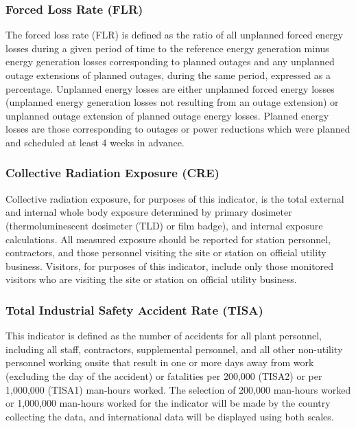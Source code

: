 \documentclass{article}
\begin{document}
\subsubsection*{Forced Loss Rate (FLR)}\label{FLR}

The forced loss rate (FLR) is defined as the ratio of all unplanned forced energy losses during a given period of time to the reference energy generation minus energy generation losses corresponding to planned outages and any unplanned outage extensions of planned outages, during the same period, expressed as a percentage.
Unplanned energy losses are either unplanned forced energy losses (unplanned energy generation losses not resulting from an outage extension) or unplanned outage extension of planned outage energy losses.
Planned energy losses are those corresponding to outages or power reductions which were planned and scheduled at least 4 weeks in advance.

\subsubsection*{Collective Radiation Exposure (CRE)}

Collective radiation exposure, for purposes of this indicator, is the total external and internal whole body exposure determined by primary dosimeter (thermoluminescent dosimeter (TLD) or film badge), and internal exposure calculations. All measured exposure should be reported for station personnel, contractors, and those personnel visiting the site or station on official utility business.
Visitors, for purposes of this indicator, include only those monitored visitors who are visiting the site or station on official utility business.

\subsubsection*{Total Industrial Safety Accident Rate (TISA)}

This indicator is defined as the number of accidents for all plant personnel, including all staff, contractors, supplemental personnel, and all other non-utility personnel working onsite that result in one or more days away from work (excluding the day of the accident) or fatalities per 200,000 (TISA2) or per 1,000,000 (TISA1) man-hours worked. The selection of 200,000 man-hours worked or 1,000,000 man-hours worked for the indicator will be made by the country collecting the data, and international data will be displayed using both scales.
\end{document}
